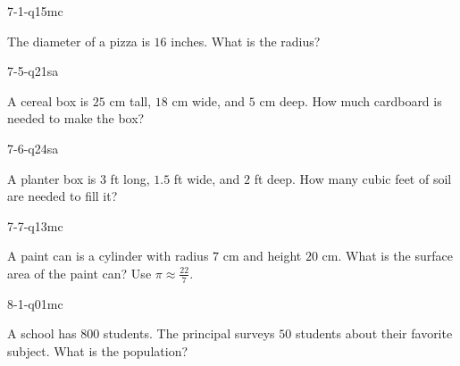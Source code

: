 \begin{practiceQuestion}{7-1-q15}{mc}
\begin{questionText}
The diameter of a pizza is $16$ inches. What is the radius?
\end{questionText}
\end{practiceQuestion}

\begin{practiceQuestion}{7-5-q21}{sa}
\begin{questionText}
A cereal box is $25$ cm tall, $18$ cm wide, and $5$ cm deep. How much cardboard is needed to make the box?
\end{questionText}
\end{practiceQuestion}

\begin{practiceQuestion}{7-6-q24}{sa}
\begin{questionText}
A planter box is $3$ ft long, $1.5$ ft wide, and $2$ ft deep. How many cubic feet of soil are needed to fill it?
\end{questionText}
\end{practiceQuestion}

\begin{practiceQuestion}{7-7-q13}{mc}
\begin{questionText}
A paint can is a cylinder with radius $7$ cm and height $20$ cm. What is the surface area of the paint can? Use $\pi \approx \frac{22}{7}$.
\end{questionText}
\end{practiceQuestion}

\begin{practiceQuestion}{8-1-q01}{mc}
\begin{questionText}
A school has $800$ students. The principal surveys $50$ students about their favorite subject. What is the population?
\end{questionText}
\end{practiceQuestion}

